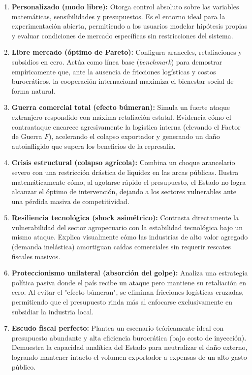 \documentclass[12pt, a4paper]{article}
\begin{document}
\begin{enumerate}
    \item \textbf{Personalizado (modo libre):} Otorga control absoluto sobre las variables matemáticas, sensibilidades y presupuestos. Es el entorno ideal para la experimentación abierta, permitiendo a los usuarios modelar hipótesis propias y evaluar condiciones de mercado específicas sin restricciones del sistema.
    
    \item \textbf{Libre mercado (óptimo de Pareto):} Configura aranceles, retaliaciones y subsidios en cero. Actúa como línea base (\textit{benchmark}) para demostrar empíricamente que, ante la ausencia de fricciones logísticas y costos burocráticos, la cooperación internacional maximiza el bienestar social de forma natural.
    
    \item \textbf{Guerra comercial total (efecto búmeran):} Simula un fuerte ataque extranjero respondido con máxima retaliación estatal. Evidencia cómo el contraataque encarece agresivamente la logística interna (elevando el Factor de Guerra $F$), acelerando el colapso exportador y generando un daño autoinfligido que supera los beneficios de la represalia.
    
    \item \textbf{Crisis estructural (colapso agrícola):} Combina un choque arancelario severo con una restricción drástica de liquidez en las arcas públicas. Ilustra matemáticamente cómo, al agotarse rápido el presupuesto, el Estado no logra alcanzar el óptimo de intervención, dejando a los sectores vulnerables ante una pérdida masiva de competitividad.
    
    \item \textbf{Resiliencia tecnológica (shock asimétrico):} Contrasta directamente la vulnerabilidad del sector agropecuario con la estabilidad tecnológica bajo un mismo ataque. Explica visualmente cómo las industrias de alto valor agregado (demanda inelástica) amortiguan caídas comerciales sin requerir rescates fiscales masivos.
    
    \item \textbf{Proteccionismo unilateral (absorción del golpe):} Analiza una estrategia política pasiva donde el país recibe un ataque pero mantiene su retaliación en cero. Al evitar el "efecto búmeran", se eliminan fricciones logísticas cruzadas, permitiendo que el presupuesto rinda más al enfocarse exclusivamente en subsidiar la industria local.
    
    \item \textbf{Escudo fiscal perfecto:} Plantea un escenario teóricamente ideal con presupuesto abundante y alta eficiencia burocrática (bajo costo de inyección). Demuestra la capacidad analítica del Estado para neutralizar el daño externo, logrando mantener intacto el volumen exportador a expensas de un alto gasto público.
\end{enumerate}
\end{document}
